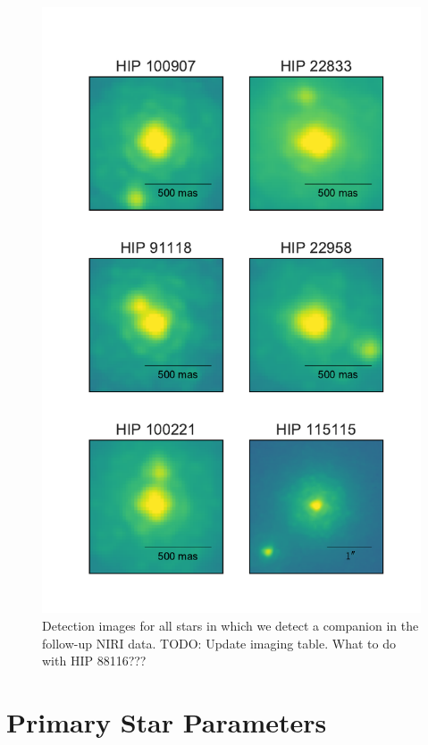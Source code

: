 \documentclass{emulateapj}
\begin{document}
\begin{figure}
\includegraphics[width=\columnwidth]{Imaging_Data.pdf}
\caption{Detection images for all stars in which we detect a companion in the follow-up NIRI data. 
TODO: Update imaging table. What to do with HIP 88116???}
\label{fig:images}
\end{figure}





\section{Primary Star Parameters}
\label{sec:sp}
\end{document}

